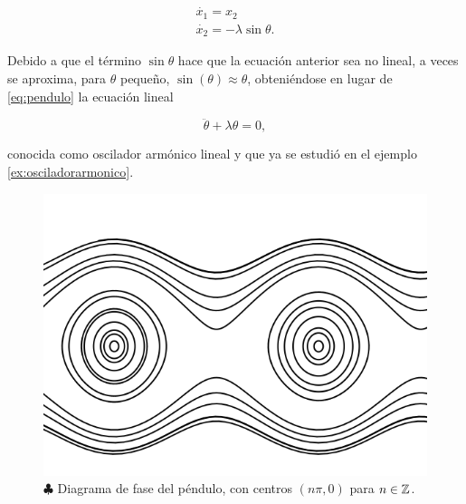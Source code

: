 \begin{example}
\begin{equation}
	\begin{array}{l}
		\dot{x_1} = x_2 \\
		\dot{x_2} = -\lambda \sin\theta.
	\end{array}
\end{equation}

Debido a que el término $\sin\theta$ hace que la ecuación anterior sea no lineal, a veces se aproxima, para $\theta$ pequeño, $\sin(\theta) \approx \theta$, obteniéndose en lugar de \ref{eq:pendulo} la ecuación lineal

$$ \ddot{\theta} + \lambda\theta = 0,$$

conocida como oscilador armónico lineal y que ya se estudió en el ejemplo \ref{ex:osciladorarmonico}.


\begin{figure}[!ht] \centering
	\includegraphics[scale=0.5]{figures/pendulomatematico-fase.png}
	\caption{$\clubsuit$ Diagrama de fase del péndulo, con centros $(n\pi, 0)$ para $n \in {\ensuremath{\mathbb{Z}}}$.}
	\label{fig:pendulomatematico}
\end{figure}

\end{example}

